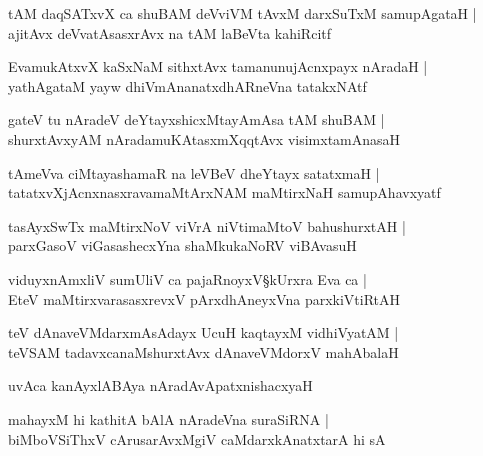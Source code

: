 \begin{shloka}
tAM daqSATxvX ca shuBAM deVviVM tAvxM darxSuTxM samupAgataH |\\
ajitAvx deVvatAsasxrAvx na tAM laBeVta kahiRcitf
\end{shloka}

\begin{shloka}
EvamukAtxvX kaSxNaM sithxtAvx tamanunujAcnxpayx nAradaH |\\
yathAgataM yayw dhiVmAnanatxdhARneVna tatakxNAtf 
\end{shloka}

\begin{shloka}
gateV tu nAradeV deYtayxshicxMtayAmAsa tAM shuBAM |\\
shurxtAvxyAM nAradamuKAtasxmXqqtAvx visimxtamAnasaH 
\end{shloka}

\begin{shloka}
tAmeVva ciMtaya\R shamaR na leVBeV dheYtayx satatxmaH |\\
tatatxvXjAcnxnasxravamaMtArxNAM maMtirxNaH samupAhavxyatf 
\end{shloka}

\begin{shloka}
tasAyxSwTx maMtirxNoV viVrA niVtimaMtoV bahushurxtAH |\\
parxGasoV viGasashecxYna shaMkukaNoRV viBAvasuH 
\end{shloka}

\begin{shloka}
viduyxnAmxliV sumUliV ca pajaRnoyxV\S kUrxra Eva ca |\\
EteV maMtirxvarasasxrevxV pArxdhAneyxVna parxkiVtiRtAH 
\end{shloka}

\begin{shloka}
teV dAnaveVMdarxmAsAdayx UcuH kaqtayxM vidhiVyatAM |\\
teVSAM tadavxcanaMshurxtAvx dAnaveVMdorxV mahAbalaH 
\end{shloka}

\begin{shloka}
uvAca kanAyxlABAya nAradAvApatxnishacxyaH 
\end{shloka}

\begin{shloka}
mahayxM hi kathitA bAlA nAradeVna suraSiRNA |\\
biMboVSiThxV cArusarAvxMgiV caMdarxkAnatxtarA hi sA
\end{shloka}

